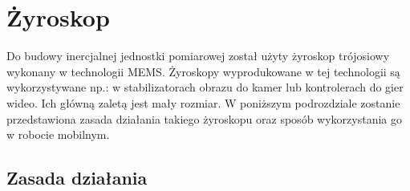 \section{Żyroskop}
Do budowy inercjalnej jednostki pomiarowej został użyty żyroskop trójosiowy
wykonany w technologii MEMS. Żyroskopy wyprodukowane w tej technologii są
wykorzystywane np.: w stabilizatorach obrazu do kamer lub kontrolerach do gier
wideo. Ich główną zaletą jest mały rozmiar. W poniższym podrozdziale zostanie 
przedstawiona zasada działania takiego żyroskopu oraz sposób wykorzystania go w
robocie mobilnym.

\subsection{Zasada działania}

